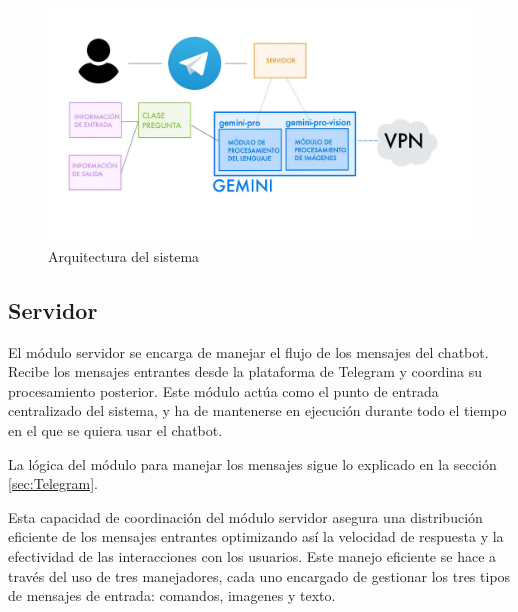 \begin{figure}[h]
	\centering
	\includegraphics[width=1\textwidth]{Imagenes/arquitectura}
	\caption{Arquitectura del sistema}
	\label{fig:arquitectura}
\end{figure}

\subsection{Servidor}

El módulo servidor se encarga de manejar el flujo de los mensajes del chatbot. Recibe los mensajes entrantes desde la plataforma de Telegram y coordina su procesamiento posterior. Este módulo actúa como el punto de entrada centralizado del sistema, y ha de mantenerse en ejecución durante todo el tiempo en el que se quiera usar el chatbot.

La lógica del módulo para manejar los mensajes sigue lo explicado en la sección \ref{sec:Telegram}.

Esta capacidad de coordinación del módulo servidor asegura una distribución eficiente de los mensajes entrantes optimizando así la velocidad de respuesta y la efectividad de las interacciones con los usuarios. Este manejo eficiente se hace a través del uso de tres manejadores, cada uno encargado de gestionar los tres tipos de mensajes de entrada: comandos, imagenes y texto. 


